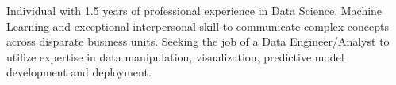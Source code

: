 %
%
%
\par{
Individual with 1.5 years of professional experience in Data Science, Machine Learning and exceptional interpersonal skill to communicate complex concepts across disparate business units. Seeking the job of a Data Engineer/Analyst to utilize expertise in data manipulation, visualization, predictive model development and deployment.

}